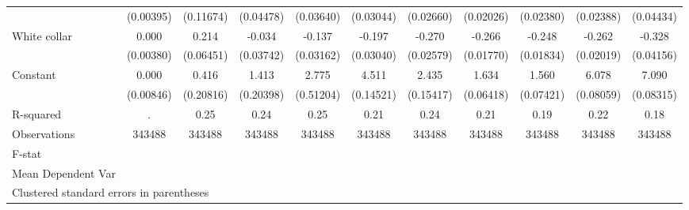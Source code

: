 {\begin{tabular}{l*{10}{c}}
                    &   (0.00395)         &   (0.11674)         &   (0.04478)         &   (0.03640)         &   (0.03044)         &   (0.02660)         &   (0.02026)         &   (0.02380)         &   (0.02388)         &   (0.04434)         \\
White collar        &       0.000         &       0.214\sym{***}&      -0.034         &      -0.137\sym{***}&      -0.197\sym{***}&      -0.270\sym{***}&      -0.266\sym{***}&      -0.248\sym{***}&      -0.262\sym{***}&      -0.328\sym{***}\\
                    &   (0.00380)         &   (0.06451)         &   (0.03742)         &   (0.03162)         &   (0.03040)         &   (0.02579)         &   (0.01770)         &   (0.01834)         &   (0.02019)         &   (0.04156)         \\
Constant            &       0.000         &       0.416\sym{*}  &       1.413\sym{***}&       2.775\sym{***}&       4.511\sym{***}&       2.435\sym{***}&       1.634\sym{***}&       1.560\sym{***}&       6.078\sym{***}&       7.090\sym{***}\\
                    &   (0.00846)         &   (0.20816)         &   (0.20398)         &   (0.51204)         &   (0.14521)         &   (0.15417)         &   (0.06418)         &   (0.07421)         &   (0.08059)         &   (0.08315)         \\
\hline
R-squared           &           .         &        0.25         &        0.24         &        0.25         &        0.21         &        0.24         &        0.21         &        0.19         &        0.22         &        0.18         \\
Observations        &      343488         &      343488         &      343488         &      343488         &      343488         &      343488         &      343488         &      343488         &      343488         &      343488         \\
F-stat              &                     &                     &                     &                     &                     &                     &                     &                     &                     &                     \\
Mean Dependent Var  &                     &                     &                     &                     &                     &                     &                     &                     &                     &                     \\
\hline\hline
\multicolumn{11}{l}{\footnotesize Clustered standard errors in parentheses}\\
\end{tabular}
}
